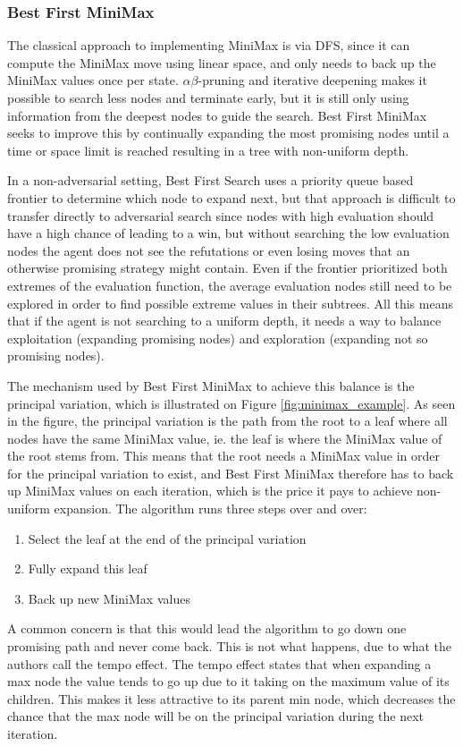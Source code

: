 

\newpage
\subsubsection{Best First MiniMax}
The classical approach to implementing MiniMax is via DFS, since it can compute the MiniMax move using linear space, and only needs to back up the MiniMax values once per state. $\alpha\beta$-pruning and iterative deepening makes it possible to search less nodes and terminate early, but it is still only using information from the deepest nodes to guide the search. Best First MiniMax seeks to improve this by continually expanding the most promising nodes until a time or space limit is reached resulting in a tree with non-uniform depth.

In a non-adversarial setting, Best First Search uses a priority queue based frontier to determine which node to expand next, but that approach is difficult to transfer directly to adversarial search since nodes with high evaluation should have a high chance of leading to a win, but without searching the low evaluation nodes the agent does not see the refutations or even losing moves that an otherwise promising strategy might contain. Even if the frontier prioritized both extremes of the evaluation function, the average evaluation nodes still need to be explored in order to find possible extreme values in their subtrees. All this means that if the agent is not searching to a uniform depth, it needs a way to balance exploitation (expanding promising nodes) and exploration (expanding not so promising nodes).

The mechanism used by Best First MiniMax \cite{Korf1996} to achieve this balance is the principal variation, which is illustrated on Figure \ref{fig:minimax_example}. As seen in the figure, the principal variation is the path from the root to a leaf where all nodes have the same MiniMax value, ie. the leaf is  where the MiniMax value of the root stems from. This means that the root needs a MiniMax value in order for the principal variation to exist, and Best First MiniMax therefore has to back up MiniMax values on each iteration, which is the price it pays to achieve non-uniform expansion. The algorithm runs three steps over and over:
\begin{enumerate}
    \item Select the leaf at the end of the principal variation
    \item Fully expand this leaf
    \item Back up new MiniMax values 
\end{enumerate}
A common concern is that this would lead the algorithm to go down one promising path and never come back. This is not what happens, due to what the authors call the tempo effect. The tempo effect states that when expanding a max node the value tends to go up due to it taking on the maximum value of its children. This makes it less attractive to its parent min node, which decreases the chance that the max node will be on the principal variation during the next iteration.

